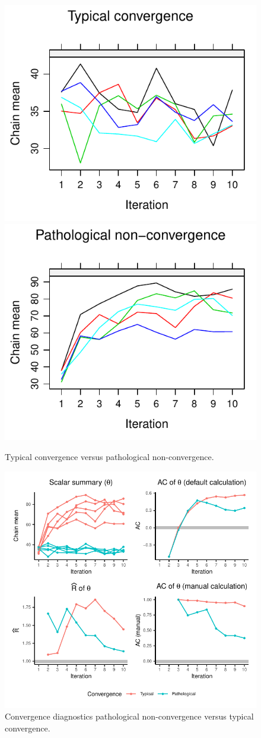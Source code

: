 \documentclass[Royal,times,sageh]{sagej}
\begin{document}
\begin{figure}

{\centering \includegraphics[width=.49\linewidth]{manuscript_files/figure-latex/non-conv-1} \includegraphics[width=.49\linewidth]{manuscript_files/figure-latex/non-conv-2} 

}

\caption{Typical convergence versus pathological non-convergence.}\label{fig:non-conv}
\end{figure}

\begin{figure}

{\centering \includegraphics{manuscript_files/figure-latex/diagnostics-1} 

}

\caption{Convergence diagnostics pathological non-convergence versus typical convergence.}\label{fig:diagnostics}
\end{figure}
\end{document}

